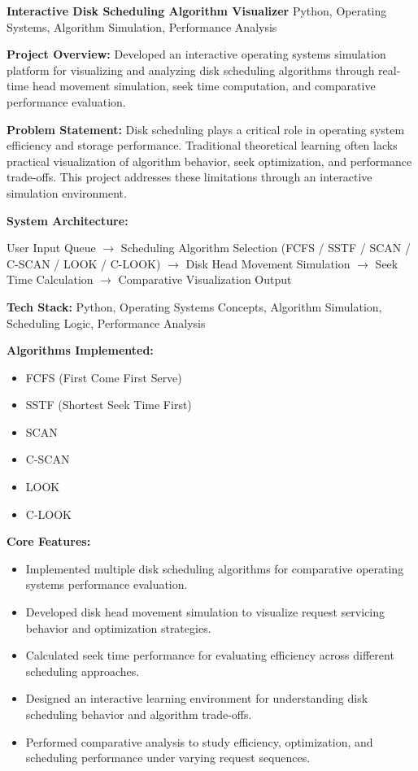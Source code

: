 \documentclass[a4paper,11pt]{article}
\newcommand{\resumeProject}[2]{
\textbf{#1} \hfill {\small #2}
}
\begin{document}
\resumeProject
{Interactive Disk Scheduling Algorithm Visualizer}
{Python, Operating Systems, Algorithm Simulation, Performance Analysis}

\textbf{Project Overview:}
Developed an interactive operating systems simulation platform for visualizing and analyzing disk scheduling algorithms through real-time head movement simulation, seek time computation, and comparative performance evaluation.

\textbf{Problem Statement:}
Disk scheduling plays a critical role in operating system efficiency and storage performance. Traditional theoretical learning often lacks practical visualization of algorithm behavior, seek optimization, and performance trade-offs. This project addresses these limitations through an interactive simulation environment.

\textbf{System Architecture:}

User Input Queue
$\rightarrow$ Scheduling Algorithm Selection
(FCFS / SSTF / SCAN / C-SCAN / LOOK / C-LOOK)
$\rightarrow$ Disk Head Movement Simulation
$\rightarrow$ Seek Time Calculation
$\rightarrow$ Comparative Visualization Output

\textbf{Tech Stack:}
Python, Operating Systems Concepts, Algorithm Simulation, Scheduling Logic, Performance Analysis

\textbf{Algorithms Implemented:}
\begin{itemize}
    \item FCFS (First Come First Serve)
    \item SSTF (Shortest Seek Time First)
    \item SCAN
    \item C-SCAN
    \item LOOK
    \item C-LOOK
\end{itemize}

\textbf{Core Features:}
\begin{itemize}

    \item Implemented multiple disk scheduling algorithms for comparative operating systems performance evaluation.

    \item Developed disk head movement simulation to visualize request servicing behavior and optimization strategies.

    \item Calculated seek time performance for evaluating efficiency across different scheduling approaches.

    \item Designed an interactive learning environment for understanding disk scheduling behavior and algorithm trade-offs.

    \item Performed comparative analysis to study efficiency, optimization, and scheduling performance under varying request sequences.

\end{itemize}
\end{document}
